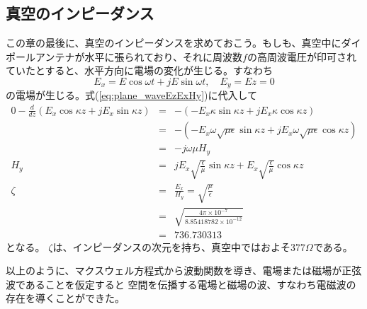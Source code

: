 \subsection*{真空のインピーダンス}
この章の最後に、真空のインピーダンスを求めておこう。もしも、真空中にダイポールアンテナが水平に張られており、それに周波数$f$の高周波電圧が印可されていたとすると、水平方向に電場の変化が生じる。すなわち
\[
E_x = E\cos\omega t + jE\sin\omega t, \quad E_y=Ez=0
\]
の電場が生じる。式(\ref{eq:plane_waveEzExHy})に代入して
\begin{eqnarray}
0 - \frac{d}{dz}(E_x\cos\kappa z + jE_x\sin\kappa z) &=& -(-E_x\kappa\sin\kappa z + jE_x\kappa\cos\kappa z) \nonumber\\
&=&-(-E_x\omega\sqrt{\mu\epsilon}\sin\kappa z + jE_x\omega\sqrt{\mu\epsilon}\cos\kappa z) \nonumber\\
&=&-j\omega\mu H_y \nonumber\\
H_y&=&jE_x\sqrt{\frac{\epsilon}{\mu}}\sin\kappa z + E_x\sqrt{\frac{\epsilon}{\mu}}\cos\kappa z \nonumber\\
\zeta &=&\frac{E_x}{H_y} = \sqrt{\frac{\mu}{\epsilon}} \nonumber\\
&=& \sqrt{\frac{4\pi \times 10^{-7}}{8.85418782 \times 10^{-12}}} \nonumber\\ 
&=& 736.730313
\end{eqnarray}
となる。
$\zeta$は、インピーダンスの次元を持ち、真空中ではおよそ377$\Omega$である。


以上のように、マクスウェル方程式から波動関数を導き、電場または磁場が正弦波であることを仮定すると
空間を伝播する電場と磁場の波、すなわち電磁波の存在を導くことができた。
